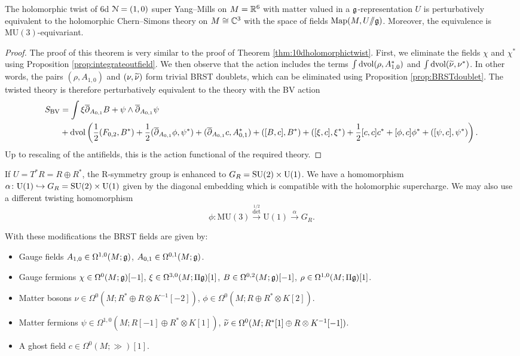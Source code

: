 \documentclass[10pt, oneside]{article}
\newcommand{\MU}{\mathrm{MU}}
\renewcommand{\U}{\mathrm{U}}
\newcommand{\ham}{/\!\!/}
\begin{document}
\begin{thm}
The holomorphic twist of 6d $\mathcal N=(1, 0)$ super Yang--Mills on $M=\mathbb R^6$ with matter valued in a $\mathfrak g$-representation $U$ is perturbatively equivalent to the holomorphic Chern--Simons theory on $M\cong \mathbb C^3$ with the space of fields $\map(M, U\ham \fg)$. Moreover, the equivalence is $\MU(3)$-equivariant.
\label{thm:6dholomorphictwist}
\end{thm}
\begin{proof}
The proof of this theorem is very similar to the proof of Theorem \ref{thm:10dholomorphictwist}. First, we eliminate the fields $\chi$ and $\chi^*$ using Proposition \ref{prop:integrateoutfield}.  We then observe that the action includes the terms $\int \operatorname{dvol}  (\rho, A_{1,0}^*)$ and $\int \operatorname{dvol} (\widetilde{\nu}, \nu^*)$.  In other words, the pairs $(\rho, A_{1,0})$ and $(\nu, \widetilde{\nu})$ form trivial BRST doublets, which can be eliminated using Proposition \ref{prop:BRSTdoublet}. The twisted theory is therefore perturbatively equivalent to the theory with the BV action 
\begin{align*}
 S_{\mathrm{BV}} &= \int \xi \overline{\partial}_{A_{0,1}} B  + \psi \wedge \overline{\partial}_{A_{0,1}} \psi \\
 &+ \operatorname{dvol}\left(\frac 12 (F_{0,2}, B^*) + \frac 12 (\overline{\partial}_{A_{0,1}} \phi, \psi^*) +  (\overline{\partial}_{A_{0, 1}} c, A_{0, 1}^*) + ([B, c], B^*) + ([\xi, c], \xi^*) + \frac{1}{2}[c, c]c^* +  [\phi, c] \phi^* + ([\psi, c],\psi^*)\right).
\end{align*}
Up to rescaling of the antifields, this is the action functional of the required theory.
\end{proof}

If $U=T^*R=R\oplus R^*$, the R-symmetry group is enhanced to $G_R=\SU(2)\times \U(1)$. We have a homomorphism $\alpha\colon \U(1)\hookrightarrow G_R=\SU(2)\times \U(1)$ given by the diagonal embedding which is compatible with the holomorphic supercharge. We may also use a different twisting homomorphism
\[\phi\colon\MU(3)\xrightarrow{\det^{1/2}}\U(1)\xrightarrow{\alpha} G_R.\]

With these modifications the BRST fields are given by:
\begin{itemize}
\item Gauge fields $A_{1, 0} \in \Omega^{1, 0}(M; \mathfrak g)$, $A_{0, 1}\in\Omega^{0, 1}(M; \mathfrak g)$.
\item Gauge fermions $\chi\in\Omega^0(M; \mathfrak g)[-1]$, $\xi\in\Omega^{3, 0}(M; \Pi\mathfrak g)[1]$, $B\in\Omega^{0, 2}(M; \mathfrak g)[-1]$, $\rho\in\Omega^{1, 0}(M; \Pi\mathfrak g)[1]$.
\item Matter bosons $\nu\in\Omega^0(M; R^*\oplus R\otimes K^{-1}[-2])$, $\phi\in\Omega^0(M; R\oplus R^*\otimes K[2])$.
\item Matter fermions $\psi\in \Omega^{1, 0}(M; R[-1]\oplus R^*\otimes K[1])$, $\widetilde{\nu}\in\Omega^0(M; R^*[1]\oplus R\otimes K^{-1}[-1])$.
\item A ghost field $c\in \Omega^0(M; \gg)[1]$.
\end{itemize}
\end{document}
